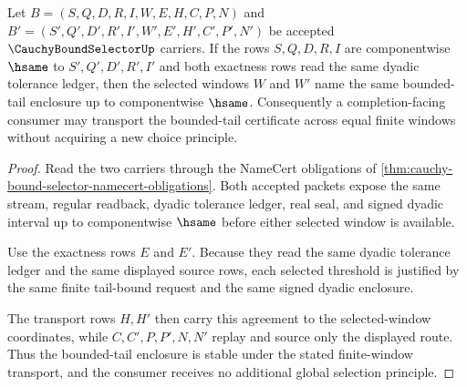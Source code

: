 \begin{theorem}
\label{thm:cauchy-bound-selector-window-stability}
Let $B=(S,Q,D,R,I,W,E,H,C,P,N)$ and $B'=(S',Q',D',R',I',W',E',H',C',P',N')$ be accepted $\CauchyBoundSelectorUp$ carriers. If the rows $S,Q,D,R,I$ are componentwise $\hsame$ to $S',Q',D',R',I'$ and both exactness rows read the same dyadic tolerance ledger, then the selected windows $W$ and $W'$ name the same bounded-tail enclosure up to componentwise $\hsame$. Consequently a completion-facing consumer may transport the bounded-tail certificate across equal finite windows without acquiring a new choice principle.
\end{theorem}
\begin{proof}
Read the two carriers through the NameCert obligations of \autoref{thm:cauchy-bound-selector-namecert-obligations}. Both accepted packets expose the same stream, regular readback, dyadic tolerance ledger, real seal, and signed dyadic interval up to componentwise $\hsame$ before either selected window is available.

Use the exactness rows $E$ and $E'$. Because they read the same dyadic tolerance ledger and the same displayed source rows, each selected threshold is justified by the same finite tail-bound request and the same signed dyadic enclosure.

The transport rows $H,H'$ then carry this agreement to the selected-window coordinates, while $C,C',P,P',N,N'$ replay and source only the displayed route. Thus the bounded-tail enclosure is stable under the stated finite-window transport, and the consumer receives no additional global selection principle.
\end{proof}



